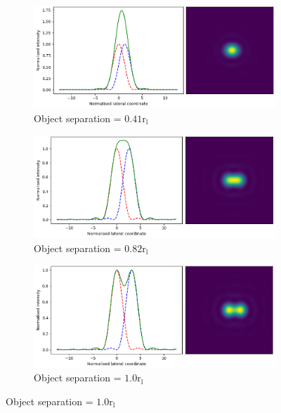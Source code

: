 \begin{figure}[h]
	\centering
	\begin{subfigure}{0.49\textwidth}
		\centering
		\includegraphics[width=\linewidth]{images/Airy_ring_2_object_seperation_0_5.png}
		\caption{Object separation = $0.41\text{r}_{\text{l}}$}
		\label{fig:Airy_ring_2_object_seperation_0_5}
	\end{subfigure}
	\begin{subfigure}{0.49\textwidth}
		\centering
		\includegraphics[width=\linewidth]{images/Airy_ring_2_object_seperation_1_0.png}
		\caption{Object separation = $0.82\text{r}_{\text{l}}$}
		\label{fig:Airy_ring_2_object_seperation_1_0}
	\end{subfigure}
	\begin{subfigure}{0.49\textwidth}
		\centering
		\includegraphics[width=\linewidth]{images/Airy_ring_2_object_seperation_1_22.png}
		\caption{Object separation = $1.0\text{r}_{\text{l}}$}

\end{subfigure}
\end{figure}
